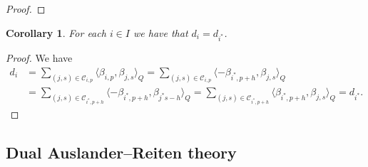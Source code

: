 \documentclass[12pt]{amsart}
\theoremstyle{plain}
\newtheorem{corollary}[theorem]{Corollary}
\theoremstyle{definition}
\numberwithin{equation}{section}
\DeclareMathOperator{\Hom}{Hom}
\newcommand{\IZ}{\widehat{I}_{\mathbb{Z}}}
\DeclareMathOperator*{\rep}{Rep}
\begin{document}
\begin{proof}
 
 \end{proof}

 \begin{corollary} \label{coro di = distar}
     For each $i \in I$  we have that $d_i = d_{i^*}$. 
 \end{corollary}

  \begin{proof}
      We have
\begin{align*}  
    d_i &= \sum_{(j,s) \in \mathcal{C}_{i,p}}  \langle \beta_{i,p} , \beta_{j,s} \rangle_Q = \sum_{(j,s) \in \mathcal{C}_{i,p}} \langle - \beta_{i^* , p+h} , \beta_{j,s} \rangle_Q \\
      &= \sum_{(j,s) \in \mathcal{C}_{i^*,p+h}} \langle - \beta_{i^*,p+h} , \beta_{j^*s-h} \rangle_Q = \sum_{(j,s) \in \mathcal{C}_{i^*,p+h}} \langle \beta_{i^*,p+h} , \beta_{j,s} \rangle_Q = d_{i^*}.  
\end{align*}  
  \end{proof}

 \subsection{Dual Auslander--Reiten theory}

  \label{sec : dual AR}
 
\end{document}
